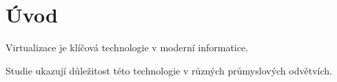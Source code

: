 \documentclass{article}
\begin{document}
    \section*{Úvod}

    Virtualizace je klíčová technologie v moderní informatice.\autocite{virtualizace-Martin-Polednik}

    Studie ukazují důležitost této technologie v různých průmyslových odvětvích.\autocite{example-key}

    \printbibliography  %
\end{document}
